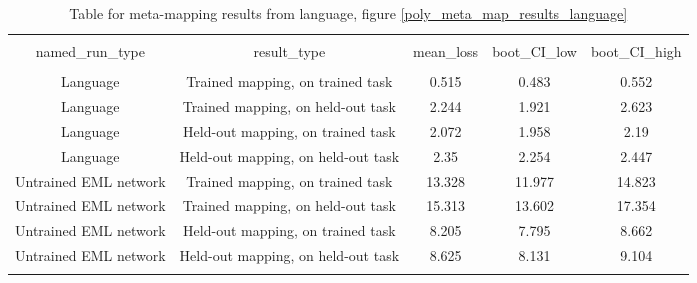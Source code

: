 \documentclass{article}
\begin{document}
\begin{table}[H]
\scriptsize
\centering
\begin{tabular}{@{\extracolsep{5pt}} ccccc} 
\\[-1.8ex]\hline 
\hline \\[-1.8ex] 
named\_run\_type & result\_type & mean\_loss & boot\_CI\_low & boot\_CI\_high \\ 
\hline \\[-1.8ex] 
Language & Trained mapping, on trained task & 0.515 & 0.483 & 0.552 \\ 
Language & Trained mapping, on held-out task & 2.244 & 1.921 & 2.623 \\ 
Language & Held-out mapping, on trained task & 2.072 & 1.958 & 2.19 \\ 
Language & Held-out mapping, on held-out task & 2.35 & 2.254 & 2.447 \\ 
Untrained EML network & Trained mapping, on trained task & 13.328 & 11.977 & 14.823 \\ 
Untrained EML network & Trained mapping, on held-out task & 15.313 & 13.602 & 17.354 \\ 
Untrained EML network & Held-out mapping, on trained task & 8.205 & 7.795 & 8.662 \\ 
Untrained EML network & Held-out mapping, on held-out task & 8.625 & 8.131 & 9.104 \\ 
\hline \\[-1.8ex] 
\end{tabular}
\caption{Table for meta-mapping results from language, figure \ref{poly_meta_map_results_language}}
\end{table}
\end{document}

